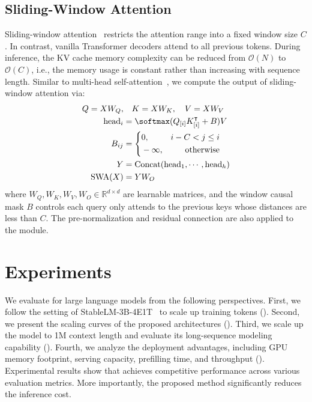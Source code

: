 \subsection{Sliding-Window Attention}
\label{sec:swa}

Sliding-window attention~\cite{sparsetransformer} restricts the attention range into a fixed window size $C$.
In contrast, vanilla Transformer decoders attend to all previous tokens.
During inference, the KV cache memory complexity can be reduced from $\mathcal{O}(N)$ to $\mathcal{O}(C)$, i.e., the memory usage is constant rather than increasing with sequence length.
Similar to multi-head self-attention~\cite{transformer}, we compute the output of sliding-window attention via:
\begin{equation}
\begin{aligned}
Q = X W_Q ,&\quad K = X W_K ,\quad V = X W_V \\
\mathrm{head}_i &= \softmax (Q_{[i]} K_{[i]}^\intercal + B) V \\
B_{ij} &=
\left\{
\begin{aligned}
& 0, &i - C < j \le i \\
& -\infty, &\text{otherwise} \\
\end{aligned}
\right. \\
Y &= \operatorname{Concat}(\mathrm{head}_1, \cdots, \mathrm{head}_h) \\
\mathrm{SWA}(X) &= Y W_O \\
\label{eq:swa}
\end{aligned}
\end{equation}
where $W_Q, W_K, W_V, W_O \in \mathbb{R}^{d\times d}$ are learnable matrices, and the window causal mask $B$ controls each query only attends to the previous keys whose distances are less than $C$.
The pre-normalization and residual connection are also applied to the module.

\section{Experiments}
\label{sec:exp}

We evaluate \our{} for large language models from the following perspectives.
First, we follow the setting of StableLM-3B-4E1T~\cite{stablelm} to scale up training tokens ().
Second, we present the scaling curves of the proposed architectures ().
Third, we scale up the \our{} model to 1M context length and evaluate its long-sequence modeling capability ().
Fourth, we analyze the deployment advantages, including GPU memory footprint, serving capacity, prefilling time, and throughput ().
Experimental results show that \our{} achieves competitive performance across various evaluation metrics. More importantly, the proposed method significantly reduces the inference cost.

